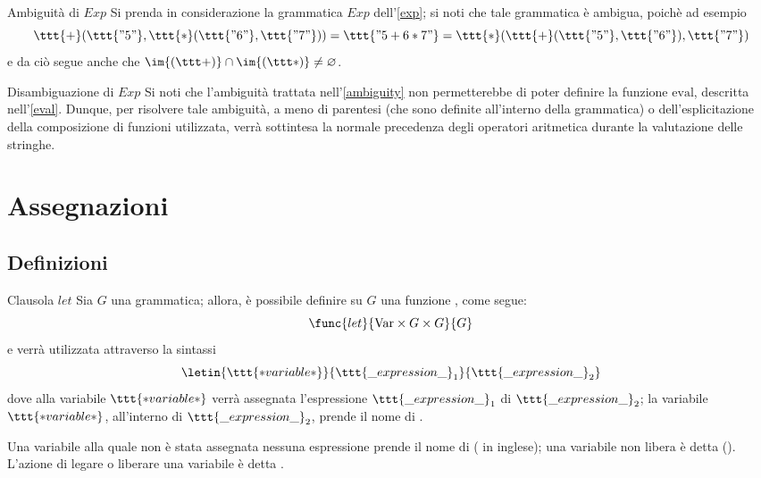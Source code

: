 \documentclass[a4paper, 12pt]{report}
\begin{document}
    \begin{framedobs}[label={ambiguity}]{Ambiguità di $Exp$}
        Si prenda in considerazione la grammatica $Exp$ dell'\cref{exp}; si noti che tale grammatica è ambigua, poichè ad esempio $$\ttt{+}(\ttt{"5"}, \ttt{*}(\ttt{"6"}, \ttt{"7"})) = \ttt{"5 + 6 * 7"} = \ttt{*}(\ttt{+}(\ttt{"5"}, \ttt{"6"}), \ttt{"7"})$$ e da ciò segue anche che $\im{(\ttt+)} \cap \im{(\ttt *)} \neq \varnothing$.
    \end{framedobs}

    \begin{framedobs}{Disambiguazione di $Exp$}
        Si noti che l'ambiguità trattata nell'\cref{ambiguity} non permetterebbe di poter definire la funzione $\mathrm{eval}$, descritta nell'\cref{eval}. Dunque, per risolvere tale ambiguità, a meno di parentesi (che  sono definite all'interno della grammatica) o dell'esplicitazione della composizione di funzioni utilizzata, verrà sottintesa la normale precedenza degli operatori aritmetica durante la valutazione delle stringhe.
    \end{framedobs}

    \section{Assegnazioni}

    \subsection{Definizioni}

    \begin{frameddefn}[label={let}]{Clausola $let$}
        Sia $G$ una grammatica; allora, è possibile definire su $G$ una funzione , come segue: $$\func{let}{\mathrm{Var} \times G \times G}{G}$$ e verrà utilizzata attraverso la sintassi $$\letin{\ttt{*variable*}}{\ttt{\_expression\_}_1}{\ttt{\_expression\_}_2}$$ dove alla variabile $\ttt{*variable*}$ verrà assegnata l'espressione $\ttt{\_expression\_}_1$  di $\ttt{\_expression\_}_2$; la variabile $\ttt{*variable*}$, all'interno di $\ttt{\_expression\_}_2$, prende il nome di .

        Una variabile alla quale non è stata assegnata nessuna espressione prende il nome di  ( in inglese); una variabile non libera è detta  (). L'azione di legare o liberare una variabile è detta .
    \end{frameddefn}
    
\end{document}
